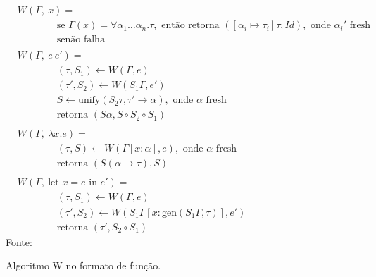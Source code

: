 \begin{figure}[ht!]
  \caption{Algoritmo W no formato de função.}
  \centering
  \begin{align*}
     & W(\Gamma,\ x)                                       =
    \\
     & \qquad{}\qquad{}\text{se } \Gamma(x) = \forall \alpha_1 \ldots \alpha_n . \tau, \text{ então retorna } ([\alpha_i \mapsto \tau_i] \tau, Id), \text{ onde } \alpha_i' \text{ fresh} \\
     & \qquad{}\qquad{}\text{senão falha}
    \\
    \\
     & W(\Gamma,\ e\  e')                                =                                                                                                                                \\
     & \qquad{}\qquad{}(\tau, S_1) \leftarrow W(\Gamma, e)                                                                                                                                \\
     & \qquad{}\qquad{}(\tau', S_2) \leftarrow W(S_1 \Gamma, e')                                                                                                                          \\
     & \qquad{}\qquad{}S \leftarrow \text{unify}(S_2 \tau, \tau' \to \alpha), \text{ onde } \alpha \text{ fresh}                                                                          \\
     & \qquad{}\qquad{}\text{retorna } (S \alpha, S \circ S_2 \circ S_1)
    \\
    \\
     & W(\Gamma,\ \lambda x . e)                          =                                                                                                                                \\
     & \qquad{}\qquad{}(\tau, S) \leftarrow W(\Gamma[x : \alpha], e), \text{ onde } \alpha \text{ fresh}                                                                                  \\
     & \qquad{}\qquad{}\text{retorna } (S (\alpha \to \tau), S)
    \\
    \\
     & W(\Gamma,\ \text{let } x = e \text{ in } e') =                                                                                                                                \\
     & \qquad{}\qquad{}(\tau, S_1) \leftarrow W(\Gamma, e)                                                                                                                                \\
     & \qquad{}\qquad{}(\tau', S_2) \leftarrow W(S_1 \Gamma[x : \text{gen}(S_1 \Gamma, \tau)], e')                                                                                        \\
     & \qquad{}\qquad{}\text{retorna } (\tau', S_2 \circ S_1)
  \end{align*}
  \small{Fonte:~\cite{CASTRO2019}}\label{fig:algoritmo-w}
\end{figure}


